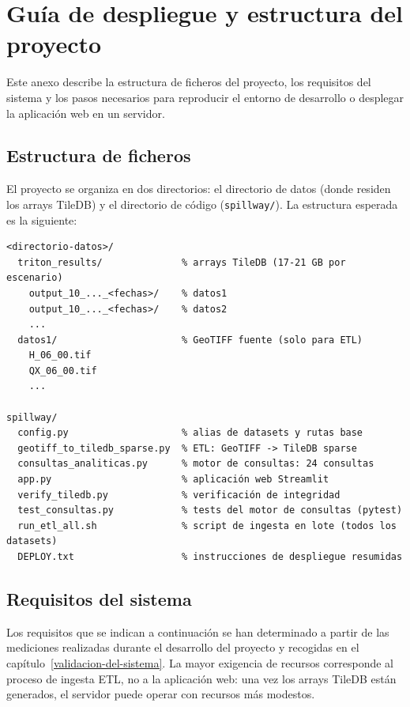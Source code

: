 \chapter{Guía de despliegue y estructura del proyecto}\label{anexo-e.-guia-de-despliegue}

Este anexo describe la estructura de ficheros del proyecto, los requisitos del sistema y los pasos necesarios para reproducir el entorno de desarrollo o desplegar la aplicación web en un servidor.

\section{Estructura de ficheros}\label{e.1-estructura-de-ficheros}

El proyecto se organiza en dos directorios: el directorio de datos (donde residen los arrays TileDB) y el directorio de código (\texttt{spillway/}). La estructura esperada es la siguiente:

\begin{verbatim}
<directorio-datos>/
  triton_results/              % arrays TileDB (17-21 GB por escenario)
    output_10_..._<fechas>/    % datos1
    output_10_..._<fechas>/    % datos2
    ...
  datos1/                      % GeoTIFF fuente (solo para ETL)
    H_06_00.tif
    QX_06_00.tif
    ...

spillway/
  config.py                    % alias de datasets y rutas base
  geotiff_to_tiledb_sparse.py  % ETL: GeoTIFF -> TileDB sparse
  consultas_analiticas.py      % motor de consultas: 24 consultas
  app.py                       % aplicación web Streamlit
  verify_tiledb.py             % verificación de integridad
  test_consultas.py            % tests del motor de consultas (pytest)
  run_etl_all.sh               % script de ingesta en lote (todos los datasets)
  DEPLOY.txt                   % instrucciones de despliegue resumidas
\end{verbatim}

\section{Requisitos del sistema}\label{e.2-requisitos}

Los requisitos que se indican a continuación se han determinado a partir de las mediciones realizadas durante el desarrollo del proyecto y recogidas en el capítulo~\ref{validacion-del-sistema}. La mayor exigencia de recursos corresponde al proceso de ingesta ETL, no a la aplicación web: una vez los arrays TileDB están generados, el servidor puede operar con recursos más modestos.

